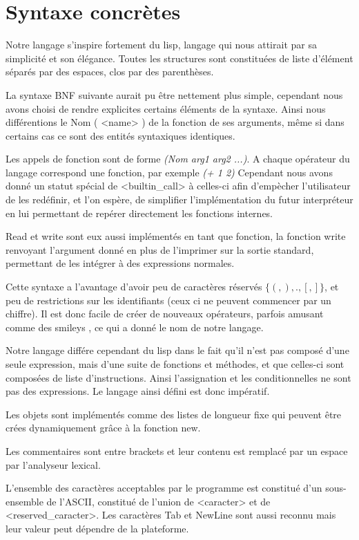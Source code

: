 \section*{Syntaxe concrètes}

Notre langage s'inspire fortement du lisp, langage qui nous attirait par sa simplicité
et son élégance. Toutes les structures sont constituées de liste d'élément séparés par
des espaces, clos par des parenthèses. 

La syntaxe BNF suivante aurait pu être nettement plus simple, cependant nous avons choisi
de rendre explicites certains éléments de la syntaxe. Ainsi nous différentions le Nom ( <name> )
de la fonction de ses arguments, même si dans certains cas ce sont des entités syntaxiques identiques. 

Les appels de fonction sont de forme \emph{(Nom arg1 arg2 ...)}. A chaque opérateur du langage 
correspond une fonction, par exemple \emph{(+ 1 2)} Cependant nous avons donné un statut spécial
de <builtin\_call> à celles-ci afin d'empècher l'utilisateur de les redéfinir, et l'on espère,
de simplifier l'implémentation du futur interpréteur en lui permettant de repérer directement
les fonctions internes. 

Read et write sont eux aussi implémentés en tant que fonction, la fonction write renvoyant
l'argument donné en plus de l'imprimer sur la sortie standard, permettant de les intégrer
à des expressions normales. 

Cette syntaxe a l'avantage d'avoir peu de caractères réservés $\{ (,),.,[,]\}$, et peu
de restrictions sur les identifiants (ceux ci ne peuvent commencer par un chiffre). Il
est donc facile de créer de nouveaux opérateurs, parfois amusant comme des smileys , ce
qui a donné le nom de notre langage.  

Notre langage différe cependant du lisp dans le fait qu'il n'est pas composé d'une seule
expression, mais d'une suite de fonctions et méthodes, et que celles-ci sont composées de
liste d'instructions. Ainsi l'assignation et les conditionnelles ne sont pas des expressions.
Le langage ainsi défini est donc impératif.

Les objets sont implémentés comme des listes de longueur fixe qui peuvent être crées dynamiquement
grâce à la fonction new.

Les commentaires sont entre brackets et leur contenu est remplacé par un espace par l'analyseur lexical. 

L'ensemble des caractères acceptables par le programme est constitué d'un sous-ensemble de l'ASCII,
constitué de l'union de <caracter> et de <reserved\_caracter>. Les caractères Tab et NewLine sont aussi
reconnu mais leur valeur peut dépendre de la plateforme. 

